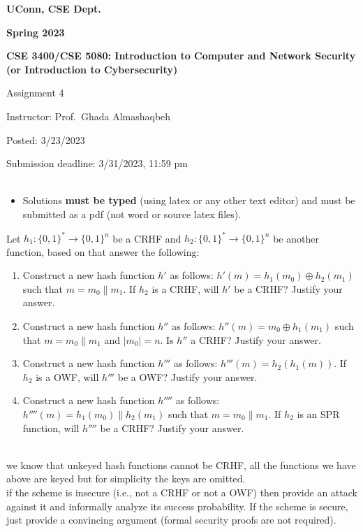 \documentclass[12pt]{article}
\newcommand{\zo}{\{0,1\}}
\newcommand*\concat{\mathbin{\|}}
\newcommand{\handout}[2]{
\renewcommand{\thepage}{\footnotesize CSE 3400/CSE 5850, #1, p. \arabic{page}}
\begin{center}

\noindent
{\bf UConn, CSE Dept.}

\noindent
{\bf Spring 2023}

\noindent
{\bf CSE 3400/CSE 5080: Introduction to Computer and Network Security \\(or Introduction to Cybersecurity)}
\end{center}

\begin{center}
{\Large #1}
\end{center}
}
\begin{document}
\handout{Assignment 4}{}

\noindent
{Instructor: Prof.~Ghada Almashaqbeh}

\noindent
{Posted: 3/23/2023}

\noindent
{Submission deadline: 3/31/2023, 11:59 pm} \\\\

\begin{itemize}
\item Solutions {\bf must be typed} (using latex or any other text editor) and must be submitted as a pdf (not word or source latex files).
\end{itemize}

Let $h_1:\zo^{*} \to \zo^{n}$ be a CRHF and $h_2: \zo^{*} \to \zo^{n}$ be another function, based on that answer the following: 
\begin{enumerate}
    \item Construct a new hash function $h'$ as follows: $h'(m) = h_1(m_0) \oplus h_2(m_1)$ such that $m = m_0 \concat m_1$. If $h_2$ is a CRHF, will $h'$ be a CRHF? Justify your answer.
    
    \item Construct a new hash function $h''$ as follows: $h''(m) = m_0 \oplus h_1(m_1)$ such that $m = m_0 \concat m_1$ and $|m_0| = n$. Is $h''$ a CRHF? Justify your answer.
    
    \item Construct a new hash function $h'''$ as follows: $h'''(m) = h_2(h_1(m))$. If $h_2$ is a OWF, will $h'''$ be a OWF? Justify your answer.

    \item Construct a new hash function $h''''$ as follows: $h''''(m) = h_1(m_0) \concat h_2(m_1)$ such that $m = m_0 \concat m_1$. If $h_2$ is an SPR function, will $h''''$ be a CRHF? Justify your answer.
\end{enumerate}\\

 we know that unkeyed hash functions cannot be CRHF, all the functions we have above are keyed but for simplicity the keys are omitted. \\
 if the scheme is insecure (i.e., not a CRHF or not a OWF) then provide an attack against it and informally analyze its success probability. If the scheme is secure, just provide a convincing argument (formal security proofs are not required). \\
\end{document}

